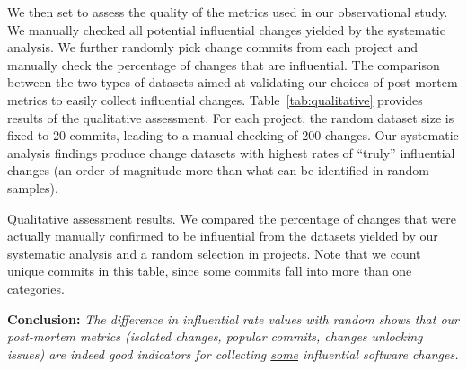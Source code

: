 We then set to assess the quality of the metrics used in our observational
study. We manually checked all potential influential changes yielded by the
systematic analysis. We further randomly pick change commits from each project
and manually check the percentage of changes that are influential. The
comparison between the two types of datasets aimed at validating our choices
of post-mortem metrics to easily collect influential changes.
Table~\ref{tab:qualitative} provides results of the qualitative assessment.
For each project, the random dataset size is fixed to 20 commits, leading to a
manual checking of 200 changes. Our systematic analysis findings produce
change datasets with highest rates of ``truly'' influential changes (an order
of magnitude more than what can be identified in random samples).

\begin{table}[t] 
\centering 
\caption{Qualitative assessment results. We
compared the percentage of changes that were actually manually confirmed to be
influential from the datasets yielded by our systematic analysis and a random
selection in projects. Note that we count unique commits in this table, since 
some commits fall into more than one categories.}

\label{tab:qualitative}
\end{table}

{\bf Conclusion:}{\it 
The difference in influential rate values with random shows that our 
post-mortem metrics (isolated changes, popular commits, changes unlocking issues) are indeed 
good indicators for collecting \underline{some} influential software changes.
                }
